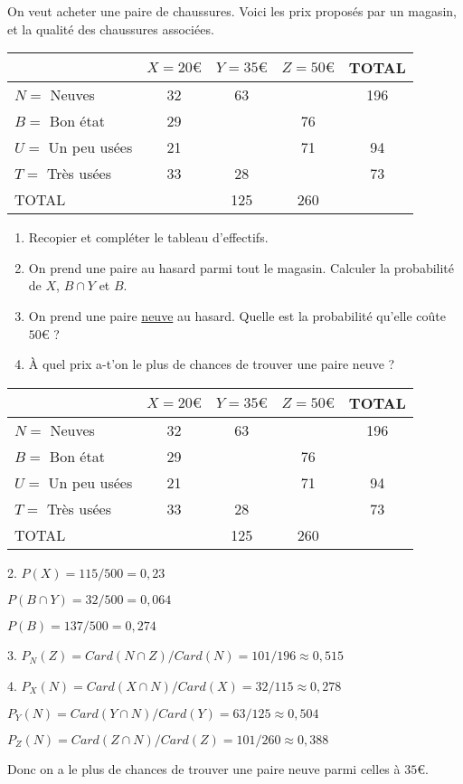 \documentclass{beamer}
\begin{document}
\newcommand{\Tableau}{\begin{tabular}{|l|c|c|c|c|}
		\hline
		\diagbox{État}{Prix} & $X = 20€$        & $Y = 35€$       & $Z = 50€$        & TOTAL \tabularnewline \hline
		$N =$ Neuves         & 32               & 63              & \correction{101} & 196 \tabularnewline \hline
		$B =$ Bon état       & 29               & \correction{32} & 76               & \correction{137} \tabularnewline \hline
		$U =$ Un peu usées   & 21               & \correction{2}  & 71               & 94 \tabularnewline \hline
		$T =$ Très usées     & 33               & 28              & \correction{12}  & 73 \tabularnewline \hline
		TOTAL                & \correction{115} & 125             & 260              & \correction{500} \tabularnewline \hline
	\end{tabular}}

\begin{frame}
	\small

	On veut acheter une paire de chaussures. Voici les prix proposés par un magasin, et la qualité des chaussures associées.
	\begin{center}
		\Tableau
	\end{center}

	\begin{enumerate}
		\item Recopier et compléter le tableau d'effectifs.
		\item On prend une paire au hasard parmi tout le magasin. Calculer la probabilité de $X$, $B ∩ Y$ et $B$.
		\item On prend une paire \uline{neuve} au hasard. Quelle est la probabilité qu'elle coûte $50€$ ?
		\item À quel prix a-t'on le plus de chances de trouver une paire neuve ?
	\end{enumerate}
\end{frame}

\newcommand{\makeCorrection}{}
\begin{frame}
	\begin{center}
		\Tableau
	\end{center}
	\color{red}

	{\small 2.}	  $P(X) = 115/500 = 0,23$

	$P(B ∩ Y) = 32/500 = 0,064$

	$P(B) = 137/500 = 0,274$

	{\small 3.} $P_N(Z) = Card(N ∩ Z) / Card(N) = 101/196 ≈ 0,515$

	{\small 4.} $P_X(N) = Card(X ∩ N) / Card(X) = 32/115 ≈ 0,278$

	$P_Y(N) = Card(Y ∩ N) / Card(Y) = 63/125 ≈ 0,504$

	$P_Z(N) = Card(Z ∩ N) / Card(Z) = 101/260 ≈ 0,388$

	Donc on a le plus de chances de trouver une paire neuve parmi celles à $35€$.
\end{frame}
\end{document}
